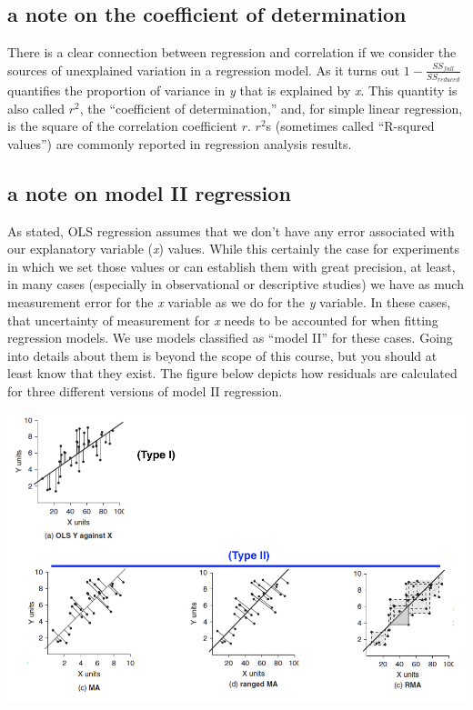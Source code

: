 \documentclass[]{book}
\begin{document}
\hypertarget{a-note-on-the-coefficient-of-determination}{%
\subsection{a note on the coefficient of determination}\label{a-note-on-the-coefficient-of-determination}}

There is a clear connection between regression and correlation if we consider the sources of unexplained variation in a regression model. As it turns out \(1-\frac{SS_{full}}{SS_{reduced}}\) quantifies the proportion of variance in \emph{y} that is explained by \emph{x}. This quantity is also called \(r^2\), the ``coefficient of determination,'' and, for simple linear regression, is the square of the correlation coefficient \(r\). \(r^2\)s (sometimes called ``R-squred values'') are commonly reported in regression analysis results.

\hypertarget{a-note-on-model-ii-regression}{%
\subsection{a note on model II regression}\label{a-note-on-model-ii-regression}}

As stated, OLS regression assumes that we don't have any error associated with our explanatory variable (\emph{x}) values. While this certainly the case for experiments in which we set those values or can establish them with great precision, at least, in many cases (especially in observational or descriptive studies) we have as much measurement error for the \emph{x} variable as we do for the \emph{y} variable. In these cases, that uncertainty of measurement for \emph{x} needs to be accounted for when fitting regression models. We use models classified as ``model II'' for these cases. Going into details about them is beyond the scope of this course, but you should at least know that they exist. The figure below depicts how residuals are calculated for three different versions of model II regression.

\begin{center}\includegraphics[width=13.89in]{images/images_5a.002} \end{center}
\end{document}
